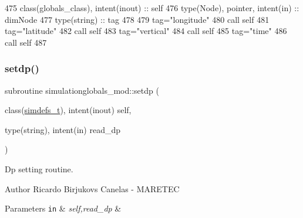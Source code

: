 \begin{DoxyCode}
475     \textcolor{keywordtype}{class}(globals\_class), \textcolor{keywordtype}{intent(inout)} :: self
476     \textcolor{keywordtype}{type}(Node), \textcolor{keywordtype}{pointer}, \textcolor{keywordtype}{intent(in)} :: dimNode
477     \textcolor{keywordtype}{type}(string) :: tag
478 
479     tag=\textcolor{stringliteral}{"longitude"}
480     \textcolor{keyword}{call }self%
481     tag=\textcolor{stringliteral}{"latitude"}
482     \textcolor{keyword}{call }self%
483     tag=\textcolor{stringliteral}{"vertical"}
484     \textcolor{keyword}{call }self%
485     tag=\textcolor{stringliteral}{"time"}
486     \textcolor{keyword}{call }self%
487 
\end{DoxyCode}
\mbox{\label{namespacesimulationglobals__mod_afda1e73e6e0cd075875c70aded99d425}} 
\subsubsection{\texorpdfstring{setdp()}{setdp()}}
{\footnotesize\ttfamily subroutine simulationglobals\+\_\+mod\+::setdp (\begin{DoxyParamCaption}\item[{class(\mbox{\hyperlink{structsimulationglobals__mod_1_1simdefs__t}{simdefs\+\_\+t}}), intent(inout)}]{self,  }\item[{type(string), intent(in)}]{read\+\_\+dp }\end{DoxyParamCaption})\hspace{0.3cm}{\ttfamily [private]}}



Dp setting routine. 

\begin{DoxyAuthor}{Author}
Ricardo Birjukovs Canelas -\/ M\+A\+R\+E\+T\+EC 
\end{DoxyAuthor}

\begin{DoxyParams}[1]{Parameters}
\mbox{\tt in}  & {\em self,read\+\_\+dp} & \\
\hline
\end{DoxyParams}


